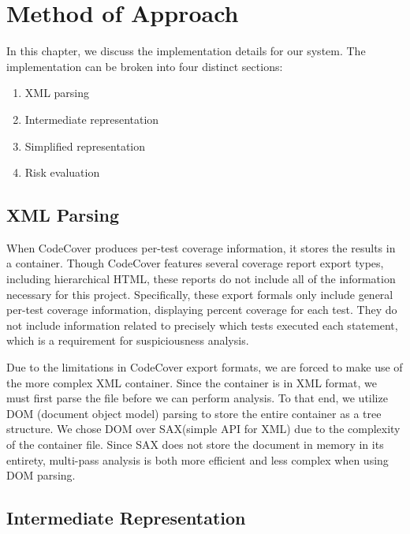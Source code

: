 %
%
%
\chapter{Method of Approach} \label{ch:method}
In this chapter, we discuss the implementation details for our system.  The
implementation can be broken into four distinct sections:

\begin{enumerate}
\item XML parsing
\item Intermediate representation
\item Simplified representation
\item Risk evaluation
\end{enumerate}

\section{XML Parsing} \label{sec:parse}

When CodeCover produces per-test coverage information, it stores the results in
a container.  Though CodeCover features several coverage report export types, 
including hierarchical HTML, these reports do not include all of the information
necessary for this project.  Specifically, these export formals only include
general per-test coverage information, displaying percent coverage for each test.
They do not include information related to precisely which tests executed each 
statement, which is a requirement for suspiciousness analysis.  

Due to the limitations in CodeCover export formats, we are forced to make use of
the more complex XML container.  Since the container is in XML format, we must
first parse the file before we can perform analysis.  To that end, we utilize
DOM (document object model) parsing to store the entire container as a tree structure.  
We chose DOM over SAX(simple API for XML) due to the complexity of the container file.
Since SAX does not store the document in memory in its entirety, multi-pass analysis
is both more efficient and less complex when using DOM parsing.

\section{Intermediate Representation} \label{sec:ir}


